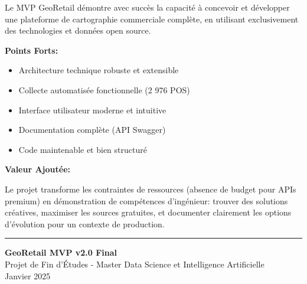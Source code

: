 \documentclass[11pt,a4paper]{article}
\begin{document}
\begin{highlightbox}
Le MVP GeoRetail démontre avec succès la capacité à concevoir et développer une plateforme de cartographie commerciale complète, en utilisant exclusivement des technologies et données open source.

\vspace{0.5cm}

\textbf{Points Forts:}
\begin{itemize}[leftmargin=*,nosep]
    \item Architecture technique robuste et extensible
    \item Collecte automatisée fonctionnelle (2 976 POS)
    \item Interface utilisateur moderne et intuitive
    \item Documentation complète (API Swagger)
    \item Code maintenable et bien structuré
\end{itemize}

\vspace{0.5cm}

\textbf{Valeur Ajoutée:}

Le projet transforme les contraintes de ressources (absence de budget pour APIs premium) en démonstration de compétences d'ingénieur: trouver des solutions créatives, maximiser les sources gratuites, et documenter clairement les options d'évolution pour un contexte de production.
\end{highlightbox}

\vfill

\begin{center}
\rule{0.5\textwidth}{0.4pt}

\vspace{0.5cm}

{\small\color{gray}
\textbf{GeoRetail MVP v2.0 Final}\\
Projet de Fin d'Études - Master Data Science et Intelligence Artificielle\\
Janvier 2025
}
\end{center}
\end{document}
